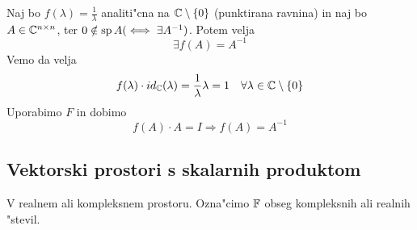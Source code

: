 Naj bo $f(\lambda) = \frac{1}{\lambda}$ analiti"cna na $\mathbb{C} \setminus \{ 0 \}$ (punktirana ravnina) in naj bo $A \in \mathbb{C}^{n \times n}$, ter $0 \notin \operatorname{sp} A (\iff \exists A^{-1})$. Potem velja
\begin{equation*}
\exists f(A) = A^{-1}
\end{equation*}
Vemo da velja
\begin{equation*}
f(\lambda) \cdot id_{\mathbb{C}} (\lambda) = \dfrac{1}{\lambda} \lambda = 1 \quad \forall \lambda \in \mathbb{C} \setminus \{ 0 \}
\end{equation*}
Uporabimo $F$ in dobimo
\begin{equation*}
f(A) \cdot A = I \Rightarrow f(A) = A^{-1}
\end{equation*}

\subsection{Vektorski prostori s skalarnih produktom}
V realnem ali kompleksnem prostoru. Ozna"cimo $\operatorname{\mathbb{F}}$ obseg kompleksnih ali realnih "stevil.


